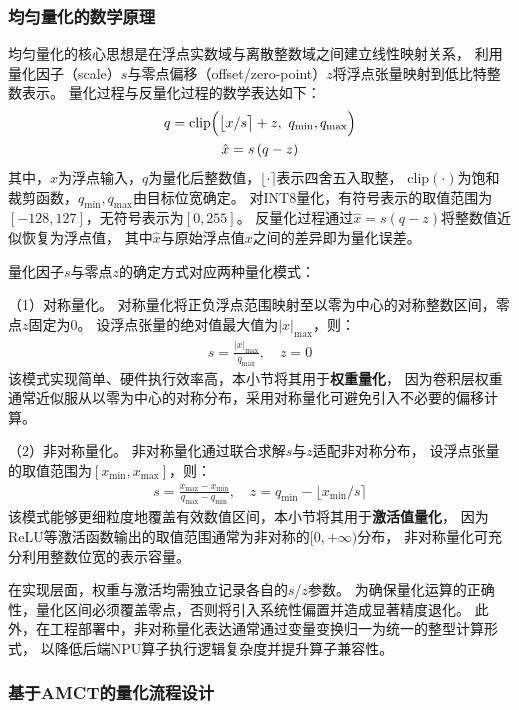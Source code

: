 \subsubsection{均匀量化的数学原理}

均匀量化的核心思想是在浮点实数域与离散整数域之间建立线性映射关系，
利用量化因子（scale）$s$与零点偏移（offset/zero-point）$z$将浮点张量映射到低比特整数表示。
量化过程与反量化过程的数学表达如下：
\begin{gather}
q=\mathrm{clip}\Bigl(\bigl\lfloor x/s \bigr\rceil+z,\ q_{\min},q_{\max}\Bigr) \\
\hat{x}=s\,(q-z)
\end{gather}
其中，$x$为浮点输入，$q$为量化后整数值，$\lfloor\cdot\rceil$表示四舍五入取整，
$\mathrm{clip}(\cdot)$为饱和裁剪函数，$q_{\min},q_{\max}$由目标位宽确定。
对INT8量化，有符号表示的取值范围为$[-128,127]$，无符号表示为$[0,255]$。
反量化过程通过$\hat{x}=s(q-z)$将整数值近似恢复为浮点值，
其中$\hat{x}$与原始浮点值$x$之间的差异即为量化误差。

量化因子$s$与零点$z$的确定方式对应两种量化模式：

（1）对称量化。
对称量化将正负浮点范围映射至以零为中心的对称整数区间，零点$z$固定为0。
设浮点张量的绝对值最大值为$|x|_{\max}$，则：
\begin{gather}
s = \frac{|x|_{\max}}{q_{\max}}, \quad z = 0
\end{gather}
该模式实现简单、硬件执行效率高，本小节将其用于\textbf{权重量化}，
因为卷积层权重通常近似服从以零为中心的对称分布，采用对称量化可避免引入不必要的偏移计算。

（2）非对称量化。
非对称量化通过联合求解$s$与$z$适配非对称分布，
设浮点张量的取值范围为$[x_{\min}, x_{\max}]$，则：
\begin{gather}
s = \frac{x_{\max} - x_{\min}}{q_{\max} - q_{\min}}, \quad z = q_{\min} - \bigl\lfloor x_{\min}/s \bigr\rceil
\end{gather}
该模式能够更细粒度地覆盖有效数值区间，本小节将其用于\textbf{激活值量化}，
因为ReLU等激活函数输出的取值范围通常为非对称的$[0, +\infty)$分布，
非对称量化可充分利用整数位宽的表示容量。

在实现层面，权重与激活均需独立记录各自的$s$/$z$参数。
为确保量化运算的正确性，量化区间必须覆盖零点，否则将引入系统性偏置并造成显著精度退化。
此外，在工程部署中，非对称量化表达通常通过变量变换归一为统一的整型计算形式，
以降低后端NPU算子执行逻辑复杂度并提升算子兼容性。


\subsubsection{基于AMCT的量化流程设计}


